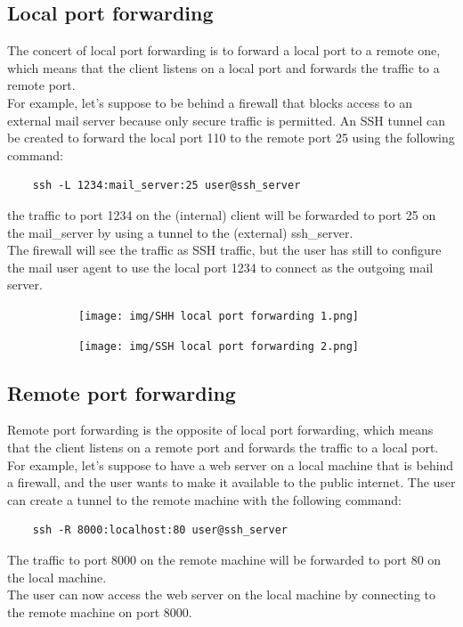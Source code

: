 \subsection{Local port forwarding}
The concert of local port forwarding is to forward a local port to a 
remote one, which means that the client listens on a local port and 
forwards the traffic to a remote port.\\
For example, let's suppose to be behind a firewall that blocks access
to an external mail server because only secure traffic is permitted.
An SSH tunnel can be created to forward the local port 110 to the
remote port 25 using the following command:
  \begin{verbatim}
    ssh -L 1234:mail_server:25 user@ssh_server
  \end{verbatim}
the traffic to port 1234 on the (internal) client will be forwarded to
port 25 on the mail\_server by using a tunnel to the (external)
ssh\_server.\\
The firewall will see the traffic as SSH traffic, but the user has
still to configure the mail user agent to use the local port 1234 to 
connect as the outgoing mail server.

\begin{figure}[H]
  \centering
  \begin{subfigure}{.5\textwidth}
    \centering
    \texttt{[image: img/SHH local port forwarding
    1.png]}
  \end{subfigure}%
  \begin{subfigure}{.5\textwidth}
    \centering
    \texttt{[image: img/SSH local port forwarding
    2.png]}
  \end{subfigure}

\end{figure}

\subsection{Remote port forwarding}
Remote port forwarding is the opposite of local port forwarding, which
means that the client listens on a remote port and forwards the 
traffic to a local port.\\
For example, let's suppose to have a web server on a local machine
that is behind a firewall, and the user wants to make it available to 
the public internet. The user can create a tunnel to the remote 
machine with the following command:
  \begin{verbatim}
    ssh -R 8000:localhost:80 user@ssh_server
  \end{verbatim}
The traffic to port 8000 on the remote machine will be forwarded to 
port 80 on the local machine.\\
The user can now access the web server on the local machine by 
connecting to the remote machine on port 8000.

